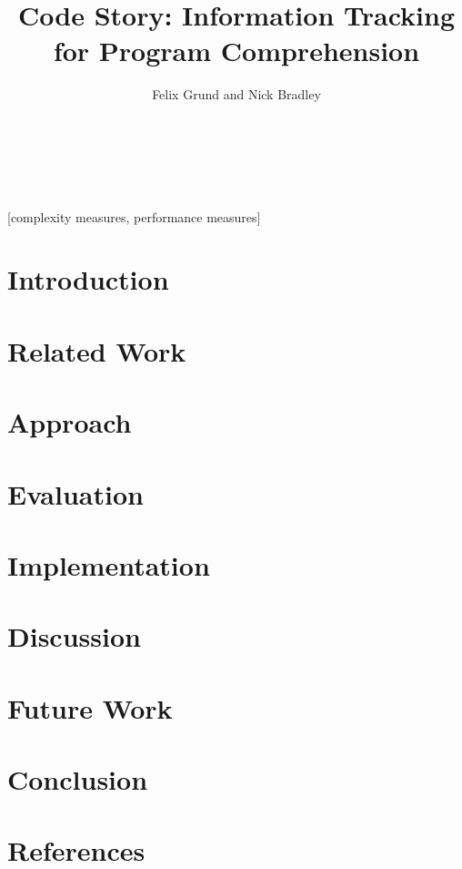 \documentclass{sig-alternate}
\begin{document}


\title{Code Story: Information Tracking for Program Comprehension}

\author{
\alignauthor
Felix Grund and Nick Bradley \\
       \\
       \\
       \\
}
\maketitle

\begin{abstract}
  
\end{abstract}

[complexity measures, performance measures]



\section{Introduction}
  
\section{Related Work}
  
\section{Approach}
  
\section{Evaluation}
  
\section{Implementation}
  
\section{Discussion}
  
\section{Future Work}
  
\section{Conclusion}
  
\section{References}
  
  
\end{document}
